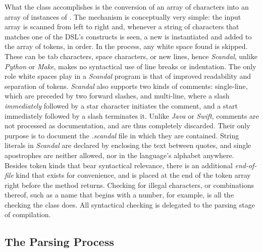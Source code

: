 What the  class accomplishes is the conversion of an array of characters into an array of instances of . The mechanism is conceptually very simple: the input array is scanned from left to right and, whenever a string of characters that matches one of the DSL's constructs is seen, a new  is instantiated and added to the array of tokens, in order. In the process, any white space found is skipped. These can be tab characters, space characters, or new lines, hence \emph{Scandal}, unlike \emph{Python} or \emph{Make}, makes no syntactical use of line breaks or indentation. The only role white spaces play in a \emph{Scandal} program is that of improved readability and separation of tokens. \emph{Scandal} also supports two kinds of comments: single-line, which are preceded by two forward slashes, and multi-line, where a slash \emph{immediately} followed by a star character initiates the comment, and a start immediately followed by a slash terminates it. Unlike \emph{Java} or \emph{Swift}, comments are not processed as documentation, and are thus completely discarded. Their only purpose is to document the \emph{.scandal} file in which they are contained. String literals in \emph{Scandal} are declared by enclosing the text between quotes, and single apostrophes are neither allowed, nor in the language's alphabet anywhere. Besides token kinds that bear syntactical relevance, there is an additional \emph{end-of-file} kind that exists for convenience, and is placed at the end of the token array right before the  method returns. Checking for illegal characters, or combinations thereof, such as a name that begins with a number, for example, is all the checking the  class does. All syntactical checking is delegated to the parsing stage of compilation.

\subsection{The Parsing Process}


